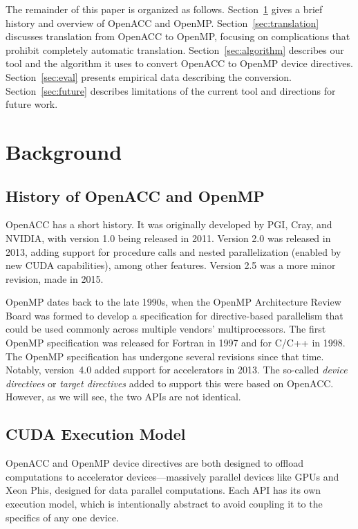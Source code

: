 \documentclass{sig-alternate-05-2015}
\begin{document}
The remainder of this paper is organized as follows.
Section~\ref{sec:bg} gives a brief history and overview of OpenACC and OpenMP\@.
Section~\ref{sec:translation} discusses translation from OpenACC to OpenMP,
focusing on complications that prohibit completely automatic translation.
Section~\ref{sec:algorithm} describes our tool and the algorithm it uses to
convert OpenACC to OpenMP device directives.
Section~\ref{sec:eval} presents empirical data describing the conversion.
Section~\ref{sec:future} describes limitations of the current tool and
directions for future work.

\section{Background}
\label{sec:bg}

\subsection{History of OpenACC and OpenMP}

OpenACC has a short history. It was originally developed by PGI, Cray, and
NVIDIA, with version 1.0 being released in 2011. Version 2.0 was released in
2013, adding support for procedure calls and nested parallelization (enabled by
new CUDA capabilities), among other features. Version 2.5 was a more minor
revision, made in 2015.

OpenMP dates back to the late 1990s, when the OpenMP Architecture Review Board
was formed to develop a specification for directive-based parallelism that
could be used commonly across multiple vendors' multiprocessors. The first
OpenMP specification was released for Fortran in 1997 and for C/C++ in 1998.
The OpenMP specification has undergone several revisions since that time.
Notably, %
version~4.0 added support for accelerators in 2013.  The so-called
\emph{device directives} or \emph{target directives} added to support this
were based on OpenACC.  However, as we will see, the two APIs are not
identical.

\subsection{CUDA Execution Model}

OpenACC and OpenMP device directives are both designed to offload computations
to accelerator devices---massively parallel devices like GPUs and Xeon Phis,
designed for data parallel computations.  Each API has its own execution model,
which is intentionally abstract to avoid coupling it to the specifics of any
one device.
\end{document}
